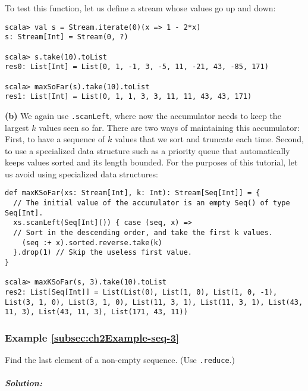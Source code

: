 To test this function, let us define a stream whose values go up and
down:
\begin{lstlisting}
scala> val s = Stream.iterate(0)(x => 1 - 2*x)
s: Stream[Int] = Stream(0, ?)

scala> s.take(10).toList
res0: List[Int] = List(0, 1, -1, 3, -5, 11, -21, 43, -85, 171)

scala> maxSoFar(s).take(10).toList
res1: List[Int] = List(0, 1, 1, 3, 3, 11, 11, 43, 43, 171)
\end{lstlisting}
\textbf{(b)} We again use \lstinline!.scanLeft!,
where now the accumulator needs to keep the largest $k$ values seen
so far. There are two ways of maintaining this accumulator: First,
to have a sequence of $k$ values that we sort and truncate each time.
Second, to use a specialized data structure such as a priority queue
that automatically keeps values sorted and its length bounded. For
the purposes of this tutorial, let us avoid using specialized data
structures:
\begin{lstlisting}
def maxKSoFar(xs: Stream[Int], k: Int): Stream[Seq[Int]] = {
  // The initial value of the accumulator is an empty Seq() of type Seq[Int].
  xs.scanLeft(Seq[Int]()) { case (seq, x) =>
  // Sort in the descending order, and take the first k values.
    (seq :+ x).sorted.reverse.take(k)
  }.drop(1) // Skip the useless first value.
}

scala> maxKSoFar(s, 3).take(10).toList
res2: List[Seq[Int]] = List(List(0), List(1, 0), List(1, 0, -1), List(3, 1, 0), List(3, 1, 0), List(11, 3, 1), List(11, 3, 1), List(43, 11, 3), List(43, 11, 3), List(171, 43, 11)) 
\end{lstlisting}

\subsubsection{Example \label{subsec:ch2Example-seq-3}\ref{subsec:ch2Example-seq-3}}

Find the last element of a non-empty sequence. (Use \lstinline!.reduce!.)

\subparagraph{Solution:}

